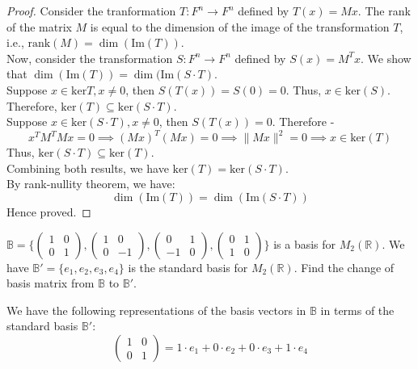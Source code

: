 \documentclass[openany]{book}
\begin{document}
\begin{proof}
    Consider the tranformation \( T: F^n \to F^n \) defined by \( T(x) = Mx \). The rank of the matrix \( M \) is equal to the dimension of the image of the transformation \( T \), i.e., \( \text{rank}(M) = \dim(\text{Im}(T)) \). \\
    Now, consider the transformation \( S: F^n \to F^n \) defined by \( S(x) = M^T x \). We show that $\dim(\text{Im}(T)) = \dim(\text{Im}(S \cdot T )$. \\
    Suppose $x \in \text{ker}{T}, x \neq 0$, then $S(T(x)) = S(0) = 0$. Thus, $x \in \text{ker}(S)$. Therefore, $\text{ker}(T) \subseteq \text{ker}(S \cdot T)$. \\
    Suppose $x \in \text{ker}(S \cdot T), x \neq 0$, then $S(T(x)) = 0$. Therefore - 
    $$x^TM^TMx = 0 \implies (Mx)^T(Mx) = 0 \implies \|Mx\|^2 = 0 \implies x \in \text{ker}(T)$$
    Thus, $\text{ker}(S \cdot T) \subseteq \text{ker}(T)$. \\
    Combining both results, we have $\text{ker}(T) = \text{ker}(S \cdot T)$. \\
    By rank-nullity theorem, we have:
    \[
    \dim(\text{Im}(T)) = \dim(\text{Im}(S \cdot T))
    \]
    Hence proved. 
\end{proof}
\begin{exercise}
    $\mathbb{B} = \{\begin{pmatrix}1 & 0 \\ 0 & 1 \end{pmatrix}, \begin{pmatrix}1 & 0 \\ 0 & -1 \end{pmatrix}, \begin{pmatrix}0 & 1 \\ -1 & 0 \end{pmatrix}, \begin{pmatrix}0 & 1 \\ 1 & 0 \end{pmatrix}\}$ is a basis for $M_2(\mathbb{R})$. We have $\mathbb{B'} = \{e_1, e_2, e_3, e_4\}$ is the standard basis for $M_2(\mathbb{R})$. Find the change of basis matrix from $\mathbb{B}$ to $\mathbb{B'}$.
\end{exercise}
We have the following representations of the basis vectors in $\mathbb{B}$ in terms of the standard basis $\mathbb{B'}$:
\[
\begin{pmatrix}1 & 0 \\ 0 & 1 \end{pmatrix} = 1 \cdot e_1 + 0 \cdot e_2 + 0 \cdot e_3 + 1 \cdot e_4
\]
\end{document}

